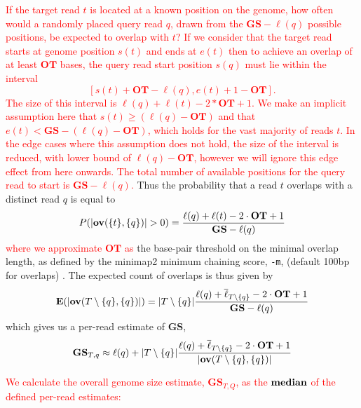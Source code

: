 \documentclass[unnumsec,webpdf,modern,large]{oup-authoring-template}
\theoremstyle{thmstyleone}%
\theoremstyle{thmstyletwo}%
\theoremstyle{thmstylethree}%
\newcommand{\overl}[2]{\mathbf{ov}(#1, #2)}
\DeclarePairedDelimiter\size{\lvert}{\rvert}
\newcommand{\gs}{\textbf{GS}}
\newcommand{\ot}{\textbf{OT}}
\newcommand{\changed}[1]{\textcolor{red}{#1}}
\begin{document}
\changed{
If the target read $t$ is located at a known position on the genome, how often would a randomly placed query read $q$, drawn from the $\gs - \ell(q)$ possible positions, be expected to overlap with $t$?
If we consider that the target read starts at genome position $s(t)$ and ends at $e(t)$ then to achieve an overlap of at least $\ot$ bases, the query read start position $s(q)$ must lie within the interval $$[s(t) +\ot - \ell(q), e(t) +1 -\ot].$$ The size of this interval is $\ell(q) +\ell(t) -2*\ot +1$.  We make an implicit assumption here that $s(t) \geq ( \ell(q)-\ot)$ and that $e(t) < \gs - (\ell(q)-\ot)$, which holds for the vast majority of reads $t$.  In the edge cases where this assumption does not hold, the size of the interval is reduced, with lower bound of $\ell(q) -\ot$, however we will ignore this edge effect from here onwards. The total number of available positions for the query read to start is $\gs - \ell(q)$.} Thus the probability that a read $t$ overlaps with a distinct read $q$ is equal to
\changed{
\begin{equation}
    P(\size{\overl{\{t\}}{\{q\}}} >0 ) =  \frac{\ell(q) + \ell(t) - 2 \cdot \ot +1 }{\gs-\ell(q)}
\end{equation}
}
\changed{where we approximate $\ot$ as} the base-pair threshold on the minimal overlap length, as defined by the minimap2 minimum chaining score, \verb|-m|, (default 100bp for overlaps) \citep{li_minimap2_2018}. The expected count of overlaps is thus given by 
\changed{
\begin{equation}
 \textbf{E}(\size{\overl{T \setminus \{q\} }{\{q\}}}) = \size{T \setminus \{q\}} \frac{\ell(q) + \overline{\ell}_{T \setminus \{q\}} - 2 \cdot \ot +1 }{\gs-\ell(q)}
\end{equation}
}
which gives us a per-read estimate of $\gs$, 
\changed{
\begin{equation}\label{eq:3}
    \gs_{T,q} \approx \ell(q) + \size{T \setminus \{q\}} \frac{\ell(q) + \overline{\ell}_{T \setminus \{q\}} - 2 \cdot \ot +1 }{\size{\overl{T \setminus \{q\}}{\{q\}}}}
\end{equation}
}


\changed{
We calculate the overall genome size estimate, $\gs_{T,Q}$, as the $\textbf{\text{median}}$ of the defined per-read estimates:
}
\end{document}

